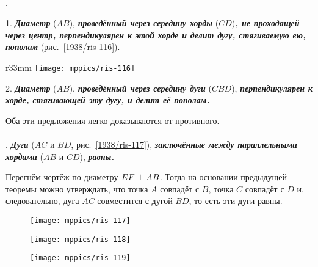 \paragraph{}\label{1938/106}
\mbox{.}

1.
\textbf{\emph{Диаметр}} ($AB$), \textbf{\emph{проведённый через середину хорды}} ($CD$)\textbf{\emph{, не проходящей через центр, перпендикулярен к этой хорде и делит дугу, стягиваемую ею, пополам}} (рис.~\ref{1938/ris-116}).

\begin{wrapfigure}{r}{33mm}
\centering
\texttt{[image: mppics/ris-116]}
\caption{}\label{1938/ris-116}
\end{wrapfigure}

2.
\textbf{\emph{Диаметр}} ($AB$), \textbf{\emph{проведённый через середину дуги}} ($CBD$), \textbf{\emph{перпендикулярен к хорде, стягивающей эту дугу, и делит её пополам.}}

Оба эти предложения легко доказываются от противного.


\paragraph{}\label{1938/107}
\mbox{.}
\textbf{\emph{Дуги}} ($AC$ и $BD$, рис.~\ref{1938/ris-117}), \textbf{\emph{заключённые между параллельными хордами}} ($AB$ и $CD$), \textbf{\emph{равны.}}

Перегнём чертёж по диаметру $EF\z\perp AB$.
Тогда на основании предыдущей теоремы можно утверждать, что точка $A$ совпадёт с $B$, точка $C$ совпадёт с $D$ и, следовательно, дуга $AC$ совместится с дугой $BD$, то есть эти дуги равны.


\begin{figure}[h]
\begin{minipage}{.32\textwidth}
\centering
\texttt{[image: mppics/ris-117]}
\end{minipage}\hfill
\begin{minipage}{.32\textwidth}
\centering
\texttt{[image: mppics/ris-118]}
\end{minipage}\hfill
\begin{minipage}{.32\textwidth}
\centering
\texttt{[image: mppics/ris-119]}
\end{minipage}

\medskip

\begin{minipage}{.32\textwidth}
\centering
\caption{}\label{1938/ris-117}
\end{minipage}\hfill
\begin{minipage}{.32\textwidth}
\centering
\caption{}\label{1938/ris-118}
\end{minipage}\hfill
\begin{minipage}{.32\textwidth}
\centering
\caption{}\label{1938/ris-119}
\end{minipage}
\vskip-4mm
\end{figure} 

